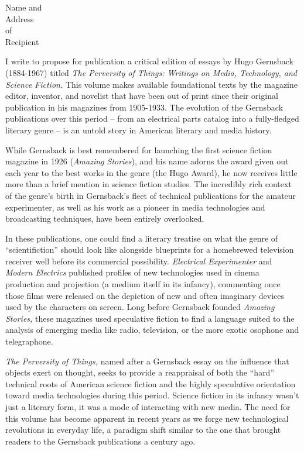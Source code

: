 \documentclass[fontsize=12pt, paper=a4]{scrlttr2}
\begin{document}
\begin{letter}{Name and \\ Address \\ of \\ Recipient}

\opening{}  %

I write to propose for publication a critical edition of essays by Hugo
Gernsback (1884-1967) titled \emph{The Perversity of Things: Writings on
Media, Technology, and Science Fiction.} This volume makes available
foundational texts by the magazine editor, inventor, and novelist that
have been out of print since their original publication in his magazines
from 1905-1933. The evolution of the Gernsback publications over this
period -- from an electrical parts catalog into a fully-fledged literary
genre -- is an untold story in American literary and media history.

While Gernsback is best remembered for launching the first science
fiction magazine in 1926 (\emph{Amazing Stories}), and his name adorns
the award given out each year to the best works in the genre (the Hugo
Award), he now receives little more than a brief mention in science
fiction studies. The incredibly rich context of the genre's birth in
Gernsback's fleet of technical publications for the amateur
experimenter, as well as his work as a pioneer in media technologies and
broadcasting techniques, have been entirely overlooked.

In these publications, one could find a literary treatise on what the
genre of ``scientifiction'' should look like alongside blueprints for a
homebrewed television receiver well before its commercial possibility.
\emph{Electrical Experimenter} and \emph{Modern Electrics} published
profiles of new technologies used in cinema production and projection (a
medium itself in its infancy), commenting once those films were released
on the depiction of new and often imaginary devices used by the
characters on screen. Long before Gernsback founded \emph{Amazing
Stories,} these magazines used speculative fiction to find a language
suited to the analysis of emerging media like radio, television, or the
more exotic osophone and telegraphone.

\emph{The Perversity of Things,} named after a Gernsback essay on the
influence that objects exert on thought, seeks to provide a reappraisal
of both the ``hard'' technical roots of American science fiction and the
highly speculative orientation toward media technologies during this
period. Science fiction in its infancy wasn't just a literary form, it
was a mode of interacting with new media. The need for this volume has
become apparent in recent years as we forge new technological
revolutions in everyday life, a paradigm shift similar to the one that
brought readers to the Gernsback publications a century ago.


\end{letter}
\end{document}
